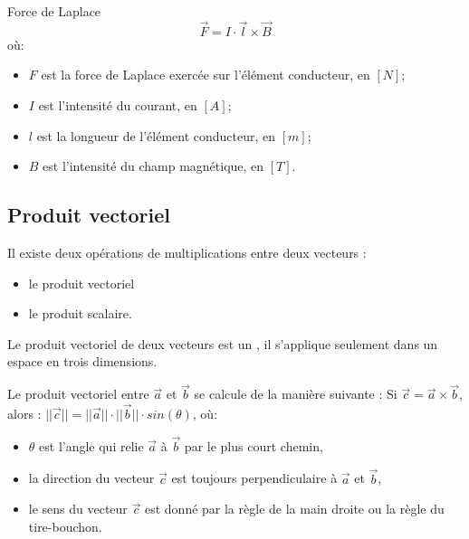 \begin{encadre_equation*}{Force de Laplace}
    \begin{equation}
        \vec{F}=I \cdot \vec{l} \times \vec{B}
    \end{equation} où:
    \begin{itemize}[label=\textbullet]
        \item \(F\) est la force de Laplace exercée sur l'élément conducteur, en \([N]\);
        \item \(I\) est l'intensité du courant, en \([A]\);
        \item \(l\) est la longueur de l'élément conducteur, en \([m]\);
        \item \(B\) est l'intensité du champ magnétique, en \([T]\).
    \end{itemize}
\end{encadre_equation*}


\subsection{Produit vectoriel}
Il existe deux opérations de multiplications entre deux vecteurs :
\begin{itemize} [label=\textbullet]
    \item le produit vectoriel
    \item le produit scalaire.
\end{itemize}

Le produit vectoriel de deux vecteurs est un , il s'applique seulement dans un espace en trois dimensions.

Le produit vectoriel entre  \(\vec{a}\) et \(\vec{b}\) se calcule de la manière suivante :
Si \(\vec{c}=\vec{a} \times \vec{b}\), alors :
\(||\vec{c}||= ||\vec{a}|| \cdot ||\vec{b}|| \cdot sin(\theta)\), où:
\begin{itemize}[label=\textbullet]
    \item \(\theta\) est l'angle qui relie \(\vec{a}\) à \(\vec{b}\) par le plus court chemin,
    \item la direction du vecteur \(\vec{c}\) est toujours perpendiculaire à \(\vec{a}\) et  \(\vec{b}\),
    \item le sens du vecteur \(\vec{c}\) est donné par la règle de la main droite ou la règle du tire-bouchon.
\end{itemize}

